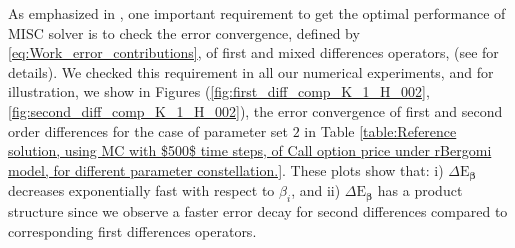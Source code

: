 \begin{remark}
As emphasized in \cite{haji2016multi}, one important requirement to get the optimal performance of MISC solver is to check  the error convergence, defined by \eqref{eq:Work_error_contributions},  of first and mixed differences operators, (see \cite{haji2016multi} for details). We checked this requirement in all our numerical experiments, and for illustration, we show in Figures (\ref{fig:first_diff_comp_K_1_H_002}, \ref{fig:second_diff_comp_K_1_H_002}), the error convergence of first and second order differences for the case of parameter set $2$ in Table \ref{table:Reference solution, using MC with $500$ time steps, of Call option price under rBergomi model, for different parameter constellation.}.  These plots show that: i) $\Delta \text{E}_{\boldsymbol{\beta}}$ decreases exponentially fast with respect to $\beta_i$, and ii) $\Delta \text{E}_{\boldsymbol{\beta}}$ has a  product structure since  we  observe  a faster error decay for second differences compared to corresponding first differences operators.
\end{remark} 

